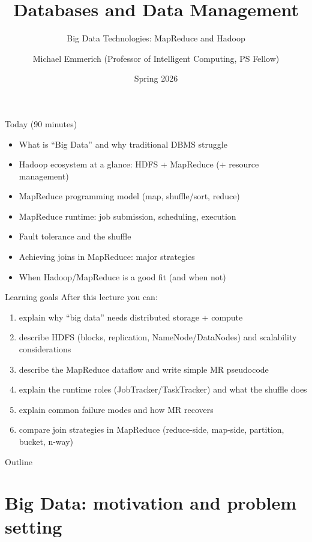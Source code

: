 \documentclass[10pt,aspectratio=169]{beamer}
\title{Databases and Data Management}
\subtitle{Big Data Technologies: MapReduce and Hadoop}
\author{Michael Emmerich (Professor of Intelligent Computing, PS Fellow)}
\institute{Faculty of Information Technology\\University of Jyväskylä}
\date{Spring 2026}
\begin{document}
\maketitle

\begin{frame}{Today (90 minutes)}
\begin{itemize}
  \item What is “Big Data” and why traditional DBMS struggle
  \item Hadoop ecosystem at a glance: HDFS + MapReduce (+ resource management)
  \item MapReduce programming model (map, shuffle/sort, reduce)
  \item MapReduce runtime: job submission, scheduling, execution
  \item Fault tolerance and the shuffle
  \item Achieving joins in MapReduce: major strategies
  \item When Hadoop/MapReduce is a good fit (and when not)
\end{itemize}
\end{frame}

\begin{frame}{Learning goals}
After this lecture you can:
\begin{enumerate}
  \item explain why “big data” needs distributed storage + compute
  \item describe HDFS (blocks, replication, NameNode/DataNodes) and scalability considerations
  \item describe the MapReduce dataflow and write simple MR pseudocode
  \item explain the runtime roles (JobTracker/TaskTracker) and what the shuffle does
  \item explain common failure modes and how MR recovers
  \item compare join strategies in MapReduce (reduce-side, map-side, partition, bucket, n-way)
\end{enumerate}
\end{frame}

\begin{frame}{Outline}
\tableofcontents
\end{frame}

\section{Big Data: motivation and problem setting}
\end{document}
